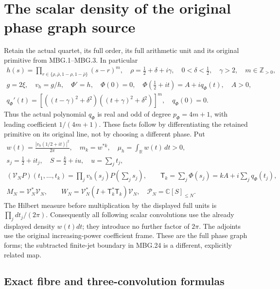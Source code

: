 \section{The scalar density of the original phase graph source}
\label{sec:pgd-density}

Retain the actual quartet, its full order, its full arithmetic unit and its
original primitive from MBG.1--MBG.3. In particular
\[
 \begin{gathered}
 h(s)=\prod_{r\in\{\rho,\bar\rho,1-\rho,1-\bar\rho\}}(s-r)^m,
 \quad \rho=\tfrac12+\delta+i\gamma,\quad
 0<\delta<\tfrac12,\quad \gamma>2,\quad m\in\mathbb Z_{>0},\\
 g=2\xi,\quad v_h=g/h,\quad \Phi'=h,\quad\Phi(0)=0,\quad
 \Phi(\tfrac12+it)=A+iq_\Phi(t),\quad A>0,\\
 q_\Phi'(t)=
 \left[((t-\gamma)^2+\delta^2)((t+\gamma)^2+\delta^2)\right]^m,
 \quad q_\Phi(0)=0.
 \end{gathered}
 \tag{PGD.1}\label{eq:pgd-data}
\]
Thus the actual polynomial \(q_\Phi\) is real and odd of degree
\(p_\Phi=4m+1\), with leading coefficient \(1/(4m+1)\).
These facts follow by differentiating the retained primitive on its
original line, not by choosing a different phase. Put
\[
 \begin{gathered}
 w(t)=\frac{|v_h(1/2+it)|^2}{2\pi},\quad
 m_k=w^{*k},\quad \mu_h=\int_{\mathbb{R}}w(t)\,dt>0,\\
 s_j=\tfrac12+it_j,\quad S=\tfrac k2+iu,\quad u=\sum_jt_j,\\
 (\mathcal V_NP)(t_1,\ldots,t_k)
       =\prod_jv_h(s_j)P\left(\sum_js_j\right),\qquad
 \mathsf T_k=\sum_j\Phi(s_j)=kA+i\sum_jq_\Phi(t_j),\\
 M_N=\mathcal V_N^*\mathcal V_N,\qquad
 W_N=\mathcal V_N^*(I+\mathsf T_k^*\mathsf T_k)\mathcal V_N,
 \quad \mathcal P_N=\mathbb{C}[S]_{\leq N}.
 \end{gathered}
 \tag{PGD.2}\label{eq:pgd-source}
\]
The Hilbert measure before multiplication by the displayed full units is
\(\prod_jdt_j/(2\pi)\). Consequently all following scalar convolutions
use the already displayed density \(w(t)dt\); they introduce no further
factor of \(2\pi\). The adjoints use the original increasing-power
coefficient frame. These are the full phase graph forms; the subtracted
finite-jet boundary in MBG.24 is a different, explicitly related map.

\subsection{Exact fibre and three-convolution formulas}

